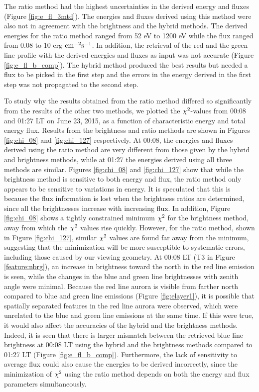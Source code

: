 \documentclass[crop=false,class=mitthesis,oneside,font=12pt]{standalone}
\begin{document}
The ratio method had the highest uncertainties in the derived energy and fluxes (Figure \ref{fig:e_fl_3mtd}). The energies and fluxes derived using this method were also not in agreement with the brightness and the hybrid methods. The derived energies for the ratio method ranged from 52 eV to 1200 eV while the flux ranged from 0.08 to 10 erg $\rm cm^{-2} s^{-1}$. In addition, the retrieval of the red and the green line profile with the derived energies and fluxes as input was not accurate (Figure \ref{fig:e_fl_b_comp}). The hybrid method produced the best results but needed a flux to be picked in the first step and the errors in the energy derived in the first step was not propagated to the second step. 

To study why the results obtained from the ratio method differed so significantly from the results of the other two methods, we plotted the $\rm \chi^2$-values from 00:08 and 01:27 LT on June 23, 2015, as a function of characteristic energy and total energy flux. Results from the brightness and ratio methods are shown in Figures \ref{fig:chi_08} and \ref{fig:chi_127} respectively. At 00:08, the energies and fluxes derived using the ratio method are very different from those given by the hybrid and brightness methods, while at 01:27 the energies derived using all three methods are similar. Figures \ref{fig:chi_08} and \ref{fig:chi_127} show that while the brightness method is sensitive to both energy and flux, the ratio method only appears to be sensitive to variations in energy. It is speculated that this is because the flux information is lost when the brightness ratios are determined, since all the brightnesses increase with increasing flux. In addition, Figure \ref{fig:chi_08} shows a tightly constrained minimum $\rm \chi^2$ for the brightness method, away from which the $\rm \chi^2$ values rise quickly. However, for the ratio method, shown in Figure \ref{fig:chi_127}, similar $\rm \chi^2$ values are found far away from the minimum, suggesting that the minimization will be more susceptible to systematic errors, including those caused by our viewing geometry. At 00:08 LT (T3 in Figure \ref{feature:nbrg}), an increase in brightness toward the north in the red line emission is seen, while the changes in the blue and green line brightnesses with zenith angle were minimal. Because the red line aurora is visible from farther north compared to blue and green line emissions (Figure \ref{fig:elayer1}), it is possible that spatially separated features in the red line aurora were observed, which were unrelated to the blue and green line emissions at the same time. If this were true, it would also affect the accuracies of the hybrid and the brightness methods. Indeed, it is seen that there is larger mismatch between the retrieved blue line brightness at 00:08 LT using the hybrid and the brightness methods compared to 01:27 LT (Figure \ref{fig:e_fl_b_comp}). Furthermore, the lack of sensitivity to average flux could also cause the energies to be derived incorrectly, since the minimization of $\rm \chi^2$ using the ratio method depends on both the energy and flux parameters simultaneously.
\end{document}
